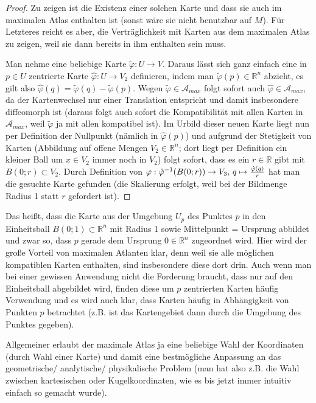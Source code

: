 \documentclass[../H_Analysis_main.tex]{subfiles}
\begin{document}
\begin{proof}
Zu zeigen ist die Existenz einer solchen Karte und dass sie auch im maximalen Atlas enthalten ist (sonst wäre sie nicht benutzbar auf $M$). Für Letzteres reicht es aber, die Verträglichkeit mit Karten aus dem maximalen Atlas zu zeigen, weil sie dann bereits in ihm enthalten sein muss.

Man nehme eine beliebige Karte $\tilde{\varphi}: U \rightarrow V$. Daraus lässt sich ganz einfach eine in $p \in U$ zentrierte Karte $\hat{\varphi}: U \rightarrow V_2$ definieren, indem man $\tilde{\varphi}(p) \in \mathbb{R}^n$ abzieht, es gilt also $\hat{\varphi}(q) = \tilde{\varphi}(q) - \tilde{\varphi}(p)$. Wegen $\tilde{\varphi} \in \mathcal{A}_{max}$ folgt sofort auch $\hat{\varphi} \in \mathcal{A}_{max}$, da der Kartenwechsel nur einer Translation entspricht und damit insbesondere diffeomorph ist (daraus folgt auch sofort die Kompatibilität mit allen Karten in $\mathcal{A}_{max}$, weil $\tilde{\varphi}$ ja mit allen kompatibel ist). Im Urbild dieser neuen Karte liegt nun per Definition der Nullpunkt (nämlich in $\hat{\varphi}(p)$) und aufgrund der Stetigkeit von Karten (Abbildung auf offene Mengen $V_2 \in \mathbb{R}^n$; dort liegt per Definition ein kleiner Ball um $x \in V_2$ immer noch in $V_2$) folgt sofort, dass es ein $r \in \mathbb{R}$ gibt mit $B(0; r) \subset V_2$. Durch Definition von $\varphi: \hat{\varphi}^{-1}\qty(B(0; r)) \rightarrow V_3, \, q \mapsto \frac{\hat{\varphi}(q)}{r}$ hat man die gesuchte Karte gefunden (die Skalierung erfolgt, weil bei der Bildmenge Radius 1 statt $r$ gefordert ist).
\end{proof}

Das heißt, dass die Karte aus der Umgebung $U_p$ des Punktes $p$ in den Einheitsball $B(0; 1) \subset \mathbb{R}^n$ mit Radius 1 sowie Mittelpunkt = Ursprung abbildet und zwar so, dass $p$ gerade dem Ursprung $0 \in \mathbb{R}^n$ zugeordnet wird. Hier wird der große Vorteil von maximalen Atlanten klar, denn weil sie alle möglichen kompatiblen Karten enthalten, sind insbesondere diese  dort drin. Auch wenn man bei einer gewissen Anwendung nicht die Forderung braucht, dass nur auf den Einheitsball abgebildet wird, finden diese um $p$ zentrierten Karten häufig Verwendung und es wird auch klar, dass Karten häufig in Abhängigkeit von Punkten $p$ betrachtet (z.B. ist das Kartengebiet dann durch die Umgebung des Punktes gegeben).

Allgemeiner erlaubt der maximale Atlas ja eine beliebige Wahl der Koordinaten (durch Wahl einer Karte) und damit eine bestmögliche Anpassung an das geometrische/ analytische/ physikalische Problem (man hat also z.B. die Wahl zwischen kartesischen oder Kugelkoordinaten, wie es bis jetzt immer intuitiv einfach so gemacht wurde).
\end{document}
